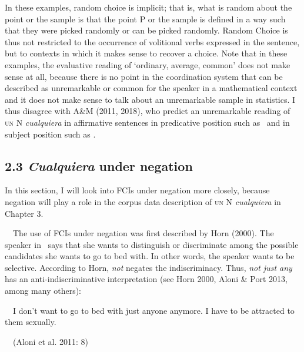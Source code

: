 \begin{styleStandard}
In these examples, random choice is implicit; that is, what is random about the point or the sample is that the point P or the sample is defined in a way such that they were picked randomly or can be picked randomly. Random Choice is thus not restricted to the occurrence of volitional verbs expressed in the sentence, but to contexts in which it makes sense to recover a choice. Note that in these examples, the evaluative reading of ‘ordinary, average, common’ does not make sense at all, because there is no point in the coordination system that can be described as unremarkable or common for the speaker in a mathematical context and it does not make sense to talk about an unremarkable sample in statistics. I thus disagree with A\&M (2011, 2018), who predict an unremarkable reading of \textsc{un} N \textit{cualquiera} in affirmative sentences in predicative position such as \ and in subject position such as .
\end{styleStandard}

\subsection[2.3 Cualquiera under negation]{\textbf{2.3 }\textbf{\textit{Cualquiera}}\textbf{ under negation}}
\begin{styleStandard}
In this section, I will look into FCIs under negation more closely, because negation will play a role in the corpus data description of \textsc{un} N \textit{cualquiera} in Chapter 3.
\end{styleStandard}

\begin{styleStandard}
\ \ The use of FCIs under negation was first described by Horn (2000). The speaker in \ says that she wants to distinguish or discriminate among the possible candidates she wants to go to bed with. In other words, the speaker wants to be selective. According to Horn, \textit{not} negates the indiscriminacy. Thus, \textit{not just any} has an anti-indiscriminative interpretation (see Horn 2000, Aloni \& Port 2013, among many others):
\end{styleStandard}

\begin{styleStandard}
\label{bkm:Ref42805181}\ \ I don’t want to go to bed with just anyone anymore. I have to be attracted to them sexually.
\end{styleStandard}

\begin{styleStandard}
\ \ (Aloni et al. 2011: 8)
\end{styleStandard}


